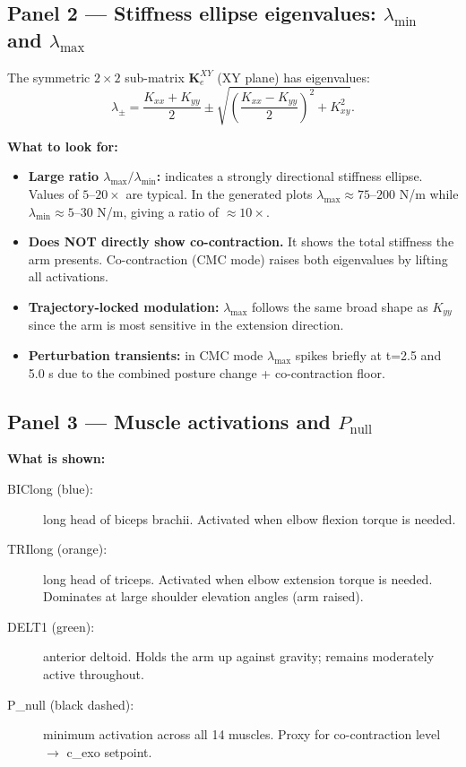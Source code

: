 \documentclass[11pt,a4paper]{article}
\begin{document}
\subsection{Panel 2 --- Stiffness ellipse eigenvalues: \texorpdfstring{$\lambda_{\min}$}{lambda\_min} and \texorpdfstring{$\lambda_{\max}$}{lambda\_max}}

The symmetric $2\times2$ sub-matrix $\mathbf{K}_e^{XY}$ (XY plane)
has eigenvalues:
\[
  \lambda_{\pm} = \frac{K_{xx}+K_{yy}}{2} \pm
    \sqrt{\left(\frac{K_{xx}-K_{yy}}{2}\right)^2 + K_{xy}^2}.
\]

\textbf{What to look for:}
\begin{itemize}
  \item \textbf{Large ratio $\lambda_\text{max}/\lambda_\text{min}$:}
        indicates a strongly directional stiffness ellipse. Values of
        $5$--$20\times$ are typical. In the generated plots
        $\lambda_\text{max}\approx 75$--$200$ N/m while
        $\lambda_\text{min}\approx 5$--$30$ N/m, giving a ratio of
        $\approx 10\times$.
  \item \textbf{Does NOT directly show co-contraction.} It shows the total
        stiffness the arm presents. Co-contraction (CMC mode) raises both
        eigenvalues by lifting all activations.
  \item \textbf{Trajectory-locked modulation:} $\lambda_\text{max}$ follows
        the same broad shape as $K_{yy}$ since the arm is most sensitive in
        the extension direction.
  \item \textbf{Perturbation transients:} in CMC mode
        $\lambda_\text{max}$ spikes briefly at t=2.5 and 5.0 s due to the
        combined posture change + co-contraction floor.
\end{itemize}

\subsection{Panel 3 --- Muscle activations and \texorpdfstring{$P_\text{null}$}{P\_null}}

\textbf{What is shown:}
\begin{description}
  \item[BIClong (blue):] long head of biceps brachii. Activated when elbow
        flexion torque is needed.
  \item[TRIlong (orange):] long head of triceps. Activated when elbow
        extension torque is needed. Dominates at large shoulder elevation
        angles (arm raised).
  \item[DELT1 (green):] anterior deltoid. Holds the arm up against gravity;
        remains moderately active throughout.
  \item[P\_null (black dashed):] minimum activation across all 14 muscles.
        Proxy for co-contraction level $\rightarrow$ c\_exo setpoint.
\end{description}
\end{document}
